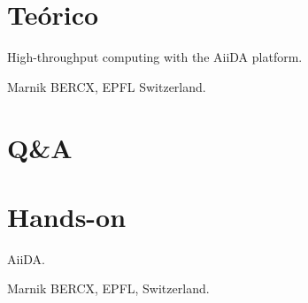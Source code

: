 \section{Teórico}

   High-throughput computing with the AiiDA platform.

   Marnik BERCX, EPFL Switzerland.

\section{Q\&A}

\section{Hands-on}

   AiiDA.

  	Marnik BERCX, EPFL, Switzerland.
